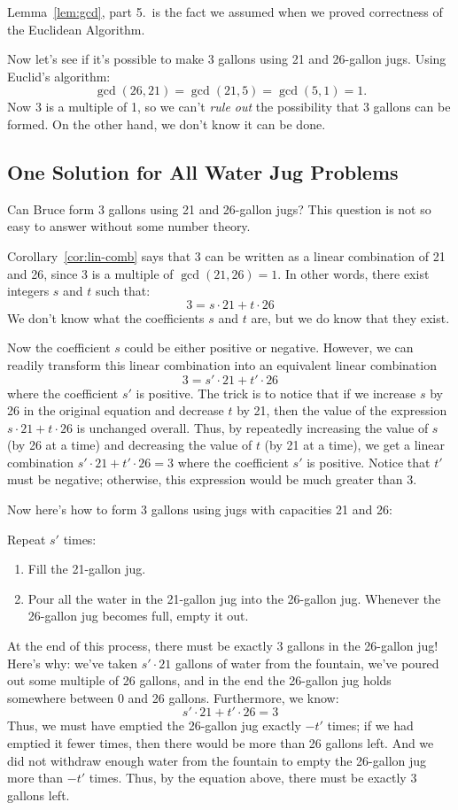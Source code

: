 Lemma~\ref{lem:gcd}, part 5.\ is the fact we assumed when we proved
correctness of the Euclidean Algorithm.

Now let's see if it's possible to make 3 gallons using 21 and 26-gallon
jugs.  Using
Euclid's algorithm:
%
\[
\gcd(26, 21) = \gcd(21, 5) = \gcd(5, 1) = 1.
\]
%
Now 3 is a multiple of 1, so we can't \textit{rule out} the possibility
that 3 gallons can be formed.  On the other hand, we don't know it can be
done.

\subsection{One Solution for All Water Jug Problems}

Can Bruce form 3 gallons using 21 and 26-gallon jugs?  This question
is not so easy to answer without some number theory.

Corollary~\ref{cor:lin-comb} says that 3 can be written as a linear
combination of 21 and 26, since 3 is a multiple of $\gcd(21, 26) = 1$.
In other words, there exist integers $s$ and $t$ such that:
%
\[
3 = s \cdot 21 + t \cdot 26
\]
%
We don't know what the coefficients $s$ and $t$ are, but we do know
that they exist.

Now the coefficient $s$ could be either positive or negative.
However, we can readily transform this linear combination into an
equivalent linear combination
%
\[
3 = s' \cdot 21 + t' \cdot 26
\]
%
where the coefficient $s'$ is positive.  The trick is to notice that
if we increase $s$ by 26 in the original equation and decrease $t$ by
21, then the value of the expression $s \cdot 21 + t \cdot 26$ is
unchanged overall.  Thus, by repeatedly increasing the value of $s$
(by 26 at a time) and decreasing the value of $t$ (by 21 at a time),
we get a linear combination $s' \cdot 21 + t' \cdot 26 = 3$ where the
coefficient $s'$ is positive.  Notice that $t'$ must be negative;
otherwise, this expression would be much greater than 3.

Now here's how to form 3 gallons using jugs with capacities 21 and 26:

Repeat $s'$ times:
\begin{enumerate}
\item Fill the 21-gallon jug.
\item Pour all the water in the 21-gallon jug into the 26-gallon jug.
Whenever the 26-gallon jug becomes full, empty it out.
\end{enumerate}
%
At the end of this process, there must be exactly 3 gallons in the
26-gallon jug!  Here's why: we've taken $s' \cdot 21$ gallons of water
from the fountain, we've poured out some multiple of 26 gallons, and
in the end the 26-gallon jug holds somewhere between 0 and 26 gallons.
Furthermore, we know:
%
\[
s' \cdot 21 + t' \cdot 26 = 3
\]
%
Thus, we must have emptied the 26-gallon jug exactly $-t'$ times; if
we had emptied it fewer times, then there would be more than 26
gallons left.  And we did not withdraw enough water from the fountain
to empty the 26-gallon jug more than $-t'$ times.  Thus, by the
equation above, there must be exactly 3 gallons left.

